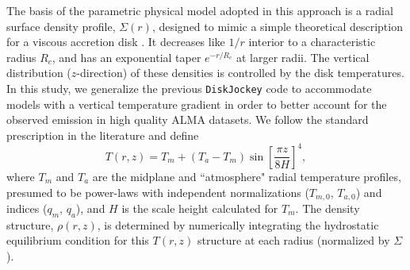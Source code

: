 \documentclass[twocolumn]{aastex6}
\begin{document}
The basis of the parametric physical model adopted in this approach is a radial surface density profile, $\Sigma(r)$, designed to mimic a simple theoretical description for a viscous accretion disk \citep{lyndenbell74,hartmann98}.  It decreases like $1/r$ interior to a characteristic radius $R_c$, and has an exponential taper $e^{-r/R_c}$ at larger radii.  The vertical distribution ($z$-direction) of these densities is controlled by the disk temperatures.  In this study, we generalize the previous {\tt DiskJockey} code to accommodate models with a vertical temperature gradient in order to better account for the observed emission in high quality ALMA datasets.  We follow the standard prescription in the literature \citep{dartois03,andrews12,rosenfeld13a} and define
\begin{equation}
	T(r, z) = T_m + (T_a - T_m)  \sin \left [ \frac{\pi z}{8 H} \right ]^4,
\end{equation}
where $T_m$ and $T_a$ are the midplane and ``atmosphere" radial temperature profiles, presumed to be power-laws with independent normalizations ($T_{m,0}$, $T_{a,0}$) and indices ($q_m$, $q_a$), and $H$ is the scale height calculated for $T_m$.  The density structure, $\rho(r, z)$, is determined by numerically integrating the hydrostatic equilibrium condition for this $T(r,z)$ structure at each radius (normalized by $\Sigma$).
\end{document}
